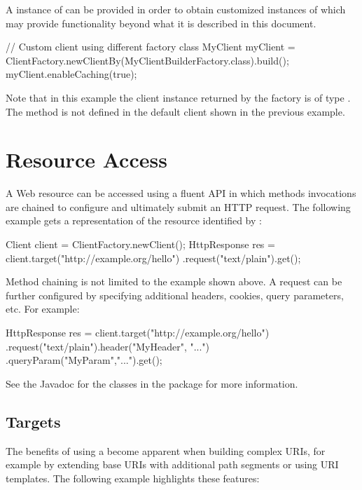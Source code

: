 A instance of  can be provided in order to obtain customized instances of  which may provide functionality beyond what it is described in this document.  

\begin{listing}{1}
// Custom client using different factory class
MyClient myClient = 
    ClientFactory.newClientBy(MyClientBuilderFactory.class).build();
myClient.enableCaching(true);
\end{listing}

Note that in this example the client instance returned by the factory is of type . The method  is not defined in the default client shown in the previous example.

\section{Resource Access}
\label{resource_access}

A Web resource can be accessed using a fluent API in which methods invocations are chained to configure and ultimately submit an HTTP request. The following example gets a  representation of the resource identified by :

\begin{listing}{1}
Client client = ClientFactory.newClient();
HttpResponse res = client.target("http://example.org/hello")
    .request("text/plain").get();
\end{listing}

Method chaining is not limited to the example shown above. A request can be further configured by specifying additional headers, cookies, query parameters, etc. For example:

\begin{listing}{1}
HttpResponse res = client.target("http://example.org/hello")
    .request("text/plain").header("MyHeader", "...")
    .queryParam("MyParam","...").get();
\end{listing}

See the Javadoc for the classes in the  package for more information.

\subsection{Targets}

The benefits of using a  become apparent when building complex URIs, for example by extending base URIs with additional path segments or using URI templates. The following example highlights these features:

